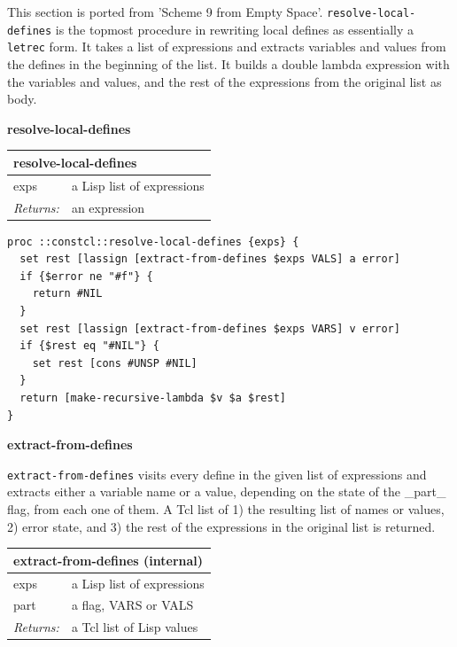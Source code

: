 \documentclass[twoside,9pt]{report}
\begin{document}
This section is ported from 'Scheme 9 from Empty Space'. \texttt{resolve-local-defines} is the topmost procedure in rewriting local defines as essentially a \texttt{letrec} form. It takes a list of expressions and extracts variables and values from the defines in the beginning of the list. It builds a double lambda expression with the variables and values, and the rest of the expressions from the original list as body.


\textbf{resolve-local-defines}

\begin{tabular}{ |l l| }
\hline
\multicolumn{2}{|l|}{resolve-local-defines} \\
\hline
exps & a Lisp list of expressions \\
\textit{Returns:} & an expression \\
\hline
\end{tabular}

\noindent\makebox[\linewidth]{\rule{\linewidth}{0.4pt}}
\begin{lstlisting}
proc ::constcl::resolve-local-defines {exps} {
  set rest [lassign [extract-from-defines $exps VALS] a error]
  if {$error ne "#f"} {
    return #NIL
  }
  set rest [lassign [extract-from-defines $exps VARS] v error]
  if {$rest eq "#NIL"} {
    set rest [cons #UNSP #NIL]
  }
  return [make-recursive-lambda $v $a $rest]
}
\end{lstlisting}
\noindent\makebox[\linewidth]{\rule{\linewidth}{0.4pt}}

\textbf{extract-from-defines}


\texttt{extract-from-defines} visits every define in the given list of expressions and extracts either a variable name or a value, depending on the state of the \_part\_ flag, from each one of them. A Tcl list of 1) the resulting list of names or values, 2) error state, and 3) the rest of the expressions in the original list is returned.

\begin{tabular}{ |l l| }
\hline
\multicolumn{2}{|l|}{extract-from-defines (internal)} \\
\hline
exps & a Lisp list of expressions \\
part & a flag, VARS or VALS \\
\textit{Returns:} & a Tcl list of Lisp values \\
\hline
\end{tabular}
\end{document}

